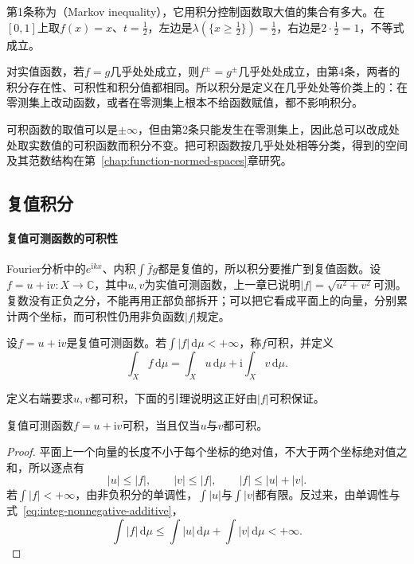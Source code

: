第1条称为（Markov inequality），它用积分控制函数取大值的集合有多大。在$[0,1]$上取$f(x)=x$、$t=\frac12$，左边是$\lambda(\{x\geq\frac12\})=\frac12$，右边是$2\cdot\frac12=1$，不等式成立。

对实值函数，若$f=g$几乎处处成立，则$f^\pm=g^\pm$几乎处处成立，由第4条，两者的积分存在性、可积性和积分值都相同。所以积分是定义在几乎处处等价类上的：在零测集上改动函数，或者在零测集上根本不给函数赋值，都不影响积分。

可积函数的取值可以是$\pm\infty$，但由第2条只能发生在零测集上，因此总可以改成处处取实数值的可积函数而积分不变。把可积函数按几乎处处相等分类，得到的空间及其范数结构在第~\ref{chap:function-normed-spaces}章研究。

\subsection{复值积分}
\label{sec:integ-complex}

\paragraph{复值可测函数的可积性}
Fourier分析中的$e^{\mathrm ikx}$、内积$\int\bar fg$都是复值的，所以积分要推广到复值函数。设$f=u+\mathrm iv:X\to\mathbb C$，其中$u,v$为实值可测函数，上一章已说明$\lvert f\rvert=\sqrt{u^2+v^2}$可测。复数没有正负之分，不能再用正部负部拆开；可以把它看成平面上的向量，分别累计两个坐标，而可积性仍用非负函数$\lvert f\rvert$规定。

\begin{definition}[复值函数的积分]
\label{def:integ-complex}
设$f=u+\mathrm iv$是复值可测函数。若$\int\lvert f\rvert\,\mathrm d\mu<+\infty$，称$f$可积，并定义
\begin{equation}
 \int_Xf\,\mathrm d\mu=\int_Xu\,\mathrm d\mu+\mathrm i\int_Xv\,\mathrm d\mu .
 \label{eq:integ-complex}
\end{equation}
\end{definition}

定义右端要求$u,v$都可积，下面的引理说明这正好由$\lvert f\rvert$可积保证。

\begin{lemma}[复值可积性的等价刻画]
\label{lem:integ-complex-integrable}
复值可测函数$f=u+\mathrm iv$可积，当且仅当$u$与$v$都可积。
\end{lemma}

\begin{proof}
平面上一个向量的长度不小于每个坐标的绝对值，不大于两个坐标绝对值之和，所以逐点有
\[
 \lvert u\rvert\leq\lvert f\rvert,\qquad\lvert v\rvert\leq\lvert f\rvert,\qquad\lvert f\rvert\leq\lvert u\rvert+\lvert v\rvert .
\]
若$\int\lvert f\rvert<+\infty$，由非负积分的单调性，$\int\lvert u\rvert$与$\int\lvert v\rvert$都有限。反过来，由单调性与式~\eqref{eq:integ-nonnegative-additive}，
\[
 \int\lvert f\rvert\,\mathrm d\mu\leq\int\lvert u\rvert\,\mathrm d\mu+\int\lvert v\rvert\,\mathrm d\mu<+\infty.
\]
\end{proof}

